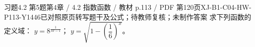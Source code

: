 \par\noindent\begin{minipage}{\linewidth}
\begin{bankitem}{习题4.2 第5题}{第4章 / 4.2 指数函数 / 教材 p.113 / PDF 第120页}{XJ-B1-C04-HW-P113-Y1446}{已对照原页转写题干及公式；待教师复核；未制作答案}
求下列函数的定义域：
$y=8^{\frac1{3x-1}}$；
$y=\sqrt{1-\left(\dfrac16\right)^x}$。
\end{bankitem}
\end{minipage}\par\medskip
